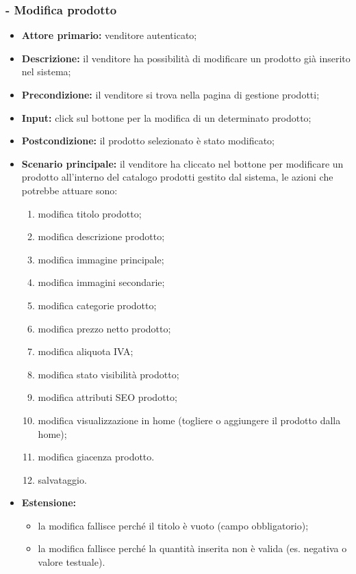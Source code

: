 \stepsubUserCase
\subsubsection{- Modifica prodotto}
\begin{itemize}
    \item \textbf{Attore primario:} venditore autenticato;
    \item \textbf{Descrizione:} il venditore ha possibilità di modificare un prodotto già inserito nel sistema;
    \item \textbf{Precondizione:} il venditore si trova nella pagina di gestione prodotti;
    \item \textbf{Input:} click sul bottone per la modifica di un determinato prodotto;
    \item \textbf{Postcondizione:} il prodotto selezionato è stato modificato;
    \item \textbf{Scenario principale:} il venditore ha cliccato nel bottone per modificare un prodotto all’interno del catalogo prodotti gestito dal sistema, le azioni che potrebbe attuare sono:
          \begin{enumerate}
              \item modifica titolo prodotto;
              \item modifica descrizione prodotto;
              \item modifica immagine principale;
              \item modifica immagini secondarie;
              \item modifica categorie prodotto;
              \item modifica prezzo netto prodotto;
              \item modifica aliquota IVA;
              \item modifica stato visibilità prodotto;
              \item modifica attributi SEO prodotto;
              \item modifica visualizzazione in home (togliere o aggiungere il prodotto dalla home);
              \item modifica giacenza prodotto.
              \item salvataggio.
          \end{enumerate}
    \item \textbf{Estensione:}
          \begin{itemize}
              \item la modifica fallisce perché il titolo è vuoto (campo obbligatorio);
              \item la modifica fallisce perché la quantità inserita non è valida (es. negativa o valore testuale).
          \end{itemize}
\end{itemize}

